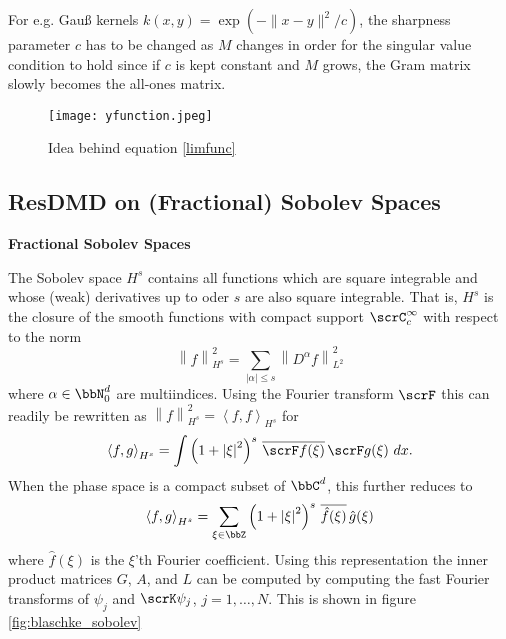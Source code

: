 For e.g. Gauß kernels $k(x,y) = \exp (- \| x - y \|^2 / c)$, the sharpness parameter $c$ 
has to be changed as $M$ changes in order for the singular value condition to hold since 
if $c$ is kept constant and $M$ grows, the Gram matrix slowly becomes the all-ones matrix. 

\begin{figure}
    \centering 
    \texttt{[image: yfunction.jpeg]}
    \caption{
        Idea behind equation \ref{limfunc}
    }
\end{figure}


\subsection{ResDMD on (Fractional) Sobolev Spaces}

\fi

\textbf{Fractional Sobolev Spaces}

The Sobolev space $H^s$ contains all functions which are square integrable and whose 
(weak) derivatives up to oder $s$ are also square integrable. That is, $H^s$ is the 
closure of the smooth functions with compact support $\scrC^\infty_c$ with respect 
to the norm 
\begin{equation}
    \left\| f \right\|_{H^s}^2 = 
    \sum_{| \alpha | \leq s} \left\| D^\alpha f \right\|_{L^2}^2
\end{equation}
where $\alpha \in \bbN_0^d$ are multiindices. 
Using the Fourier transform $\scrF$ this can readily be rewritten as 
$\left\| f \right\|_{H^s}^2 = \left\langle f, f \right\rangle_{H^s}$ for
\begin{equation}
    \left\langle f, g \right\rangle_{H^s} = 
    \int \left( 1 + \left| \xi \right|^2 \right)^s 
    \,\overline{ \scrF f (\xi) }\, \scrF g (\xi) \ dx . 
\end{equation}
When the phase space is a compact subset of $\bbC^d$, this further reduces to 
\begin{equation}
    \left\langle f, g \right\rangle_{H^s} = 
    \sum_{\xi \in \bbZ} \left( 1 + \left| \xi \right|^2 \right)^s 
    \,\overline{ \hat{f} (\xi) }\, \hat{g} (\xi) 
\end{equation}
where $\hat{f} (\xi)$ is the $\xi$'th Fourier coefficient. Using this representation 
the inner product matrices $G$, $A$, and $L$ can be computed by computing the fast 
Fourier transforms of $\psi_j$ and $\scrK \psi_j$, $j = 1, \ldots, N$. This is shown in 
figure \ref{fig:blaschke_sobolev}

